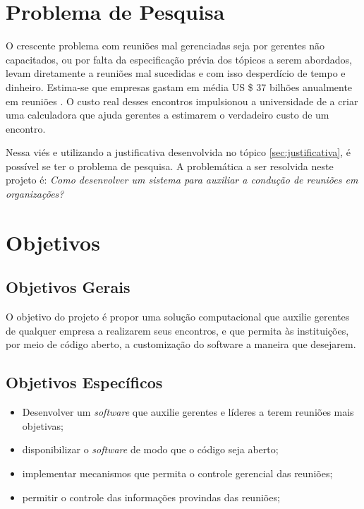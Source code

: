 \section{Problema de Pesquisa}
\label{sec:problema_de_pesquisa}

O crescente problema com reuniões mal gerenciadas seja por gerentes não capacitados, ou por falta da especificação prévia dos tópicos a serem abordados, levam diretamente a reuniões mal sucedidas e com isso desperdício de tempo e dinheiro. Estima-se que empresas gastam em média US \$ 37 bilhões anualmente em reuniões . O custo real desses encontros impulsionou a universidade de  a criar uma calculadora que ajuda gerentes a estimarem o verdadeiro custo de um encontro.

Nessa viés e utilizando a justificativa desenvolvida no tópico \ref{sec:justificativa}, é possível se ter o problema de pesquisa. A problemática a ser resolvida neste projeto é: \textit{Como desenvolver um sistema para auxiliar a condução de reuniões em organizações?}

\section{Objetivos}
\label{sec:objetivos}

\subsection{Objetivos Gerais}
\label{sec:objetivos_gerais}

O objetivo do projeto é propor uma solução computacional que auxilie gerentes de qualquer empresa a realizarem seus encontros, e que permita às instituições, por meio de código aberto, a customização do software a maneira que desejarem. 

\subsection{Objetivos Específicos}
\label{sec:objetivos_especificos}

\begin{itemize}
    \item Desenvolver um \textit{software} que auxilie gerentes e líderes a terem reuniões mais objetivas;
    \item disponibilizar o \textit{software} de modo que o código seja aberto;
    \item implementar mecanismos que permita o controle gerencial das reuniões;
    \item permitir o controle das informações provindas das reuniões;
\end{itemize}